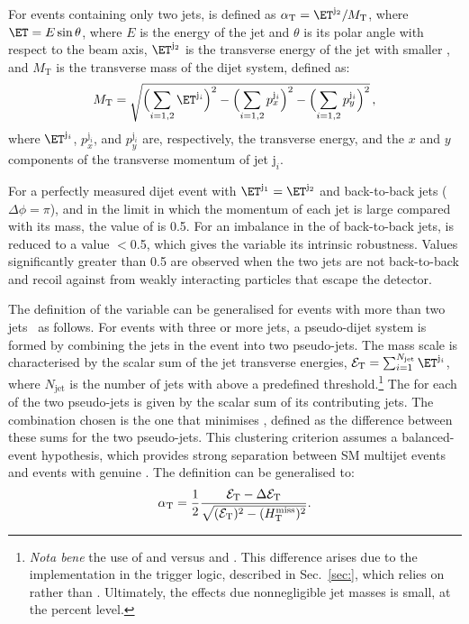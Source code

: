 For events containing only two jets, \alphat is defined as $\alphat =
\ET^{\mathrm{j}_2}/M_\mathrm{T}$, where $\ET= E\sin\theta$, where $E$
is the energy of the jet and $\theta$ is its polar angle with respect
to the beam axis, $\ET^{\mathrm{j}_2}$ is the transverse energy of the
jet with smaller \ET, and $M_\mathrm{T}$ is the transverse mass of the
dijet system, defined as:
\begin{equation}
  \label{eq:mt}
  M_\mathrm{T} = \sqrt{ \Bigl( \sum_{i=1,2} \ET^{\mathrm{j}_i}
    \Bigr)^2 - \Bigl( \sum_{i=1,2} p_x^{\mathrm{j}_i} \Bigr)^2 - \Bigl(
      \sum_{i=1,2} p_y^{\mathrm{j}_i} \Bigr)^2}\, ,
\end{equation}
where $\ET^{\mathrm{j}_i}$, $p_x^{\mathrm{j}_i}$, and
$p_y^{\mathrm{j}_i}$ are, respectively, the transverse energy, and the
$x$ and $y$ components of the transverse momentum of jet
$\mathrm{j}_i$.

For a perfectly measured dijet event with $\ET^{\mathrm{j_1}} =
\ET^{\mathrm{j_2}}$ and back-to-back jets ($\Delta\phi = \pi$), and in
the limit in which the momentum of each jet is large compared with its
mass, the value of \alphat is 0.5. For an imbalance in the \ET of
back-to-back jets, \alphat is reduced to a value $<$0.5, which gives
the variable its intrinsic robustness. Values significantly greater
than 0.5 are observed when the two jets are not back-to-back and
recoil against \ptvecmiss from weakly interacting particles that
escape the detector.

The definition of the \alphat variable can be generalised for events
with more than two jets~\cite{RA1Paper} as follows. For events with
three or more jets, a pseudo-dijet system is formed by combining the
jets in the event into two pseudo-jets. The mass scale is
characterised by the scalar sum of the jet transverse energies,
$\scalst = \sum_{i=1}^{N_\text{jet}} \ET^{\mathrm{j}_i}$, where
$N_\text{jet}$ is the number of jets with \ET above a predefined
threshold.\footnote{{\it Nota bene} the use of \Et and \scalst versus
  \Pt and \scalht. This difference arises due to the implementation in
  the trigger logic, described in Sec.~\ref{sec:}, which relies on \Et
  rather than \Pt. Ultimately, the effects due nonnegligible jet
  masses is small, at the percent level.} The \scalst for each of the
two pseudo-jets is given by the scalar \ET sum of its contributing
jets. The combination chosen is the one that minimises \dst, defined
as the difference between these sums for the two pseudo-jets.  This
clustering criterion assumes a balanced-event hypothesis, which
provides strong separation between SM multijet events and events with
genuine \ptvecmiss. The \alphat definition can be generalised to:
\begin{equation}
  \label{eq:alphat}
  \alpha_{\text{T}} = \frac{1}{2} \frac{\mathcal{E}_\mathrm{T} -
    \Delta\mathcal{E}_\mathrm{T}}{\sqrt{(\mathcal{E}_\mathrm{T})^2 - (\mbox{$H_{\rm T}^{\rm miss}$})^2}}.
\end{equation}

